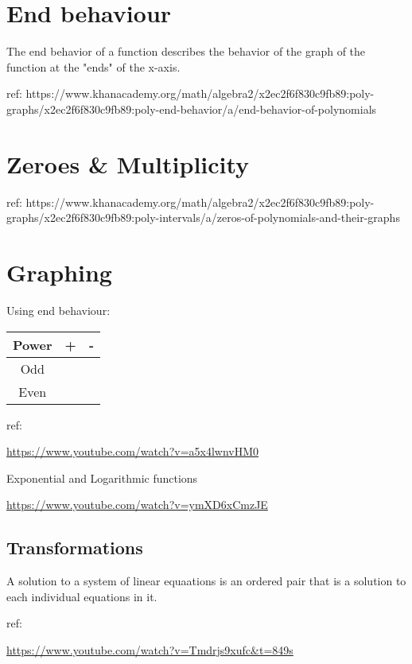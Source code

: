 \documentclass[openany]{book}
\begin{document}
\section{End behaviour}
The end behavior of a function describes the behavior of the graph of the function at the "ends" of the x-axis. 

ref:
https://www.khanacademy.org/math/algebra2/x2ec2f6f830c9fb89:poly-graphs/x2ec2f6f830c9fb89:poly-end-behavior/a/end-behavior-of-polynomials

\section{Zeroes \& Multiplicity}

ref:
https://www.khanacademy.org/math/algebra2/x2ec2f6f830c9fb89:poly-graphs/x2ec2f6f830c9fb89:poly-intervals/a/zeros-of-polynomials-and-their-graphs

\section{Graphing}
Using end behaviour:

\begin{tabular}{| c | L | L |}
	\hline
	
	Power & +                  & -                    \\
	\hline
	
	Odd   & \downarrow\uparrow & \uparrow\downarrow   \\
	Even  & \uparrow\uparrow   & \downarrow\downarrow \\
	
	\hline
\end{tabular}

ref:

\url{https://www.youtube.com/watch?v=a5x4lwnvHM0}

Exponential and Logarithmic functions

\url{https://www.youtube.com/watch?v=ymXD6xCmzJE}

\subsection{Transformations}

A solution to a system of linear equaations is an ordered pair that is a solution to each individual equations in it.

ref:

\url{https://www.youtube.com/watch?v=Tmdrjs9xufc&t=849s}
\end{document}
